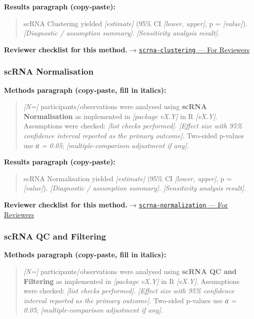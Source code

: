 \documentclass[
]{article}
\begin{document}
\textbf{Results paragraph (copy-paste):}

\begin{quote}
scRNA Clustering yielded \emph{{[}estimate{]}} (95\% CI \emph{{[}lower,
upper{]}}, p = \emph{{[}value{]}}). \emph{{[}Diagnostic / assumption
summary{]}}. \emph{{[}Sensitivity analysis result{]}}.
\end{quote}

\textbf{Reviewer checklist for this method.} →
\href{../chapters/12-bioinformatics/scrna-clustering.Rmd\#for-reviewers}{\texttt{scrna-clustering}
--- For Reviewers}

\subsubsection{scRNA Normalisation}\label{scrna-normalisation}

\textbf{Methods paragraph (copy-paste, fill in italics):}

\begin{quote}
\emph{{[}N={]}} participants/observations were analysed using
\textbf{scRNA Normalisation} as implemented in \emph{{[}package vX.Y{]}}
in R \emph{{[}vX.Y{]}}. Assumptions were checked: \emph{{[}list checks
performed{]}}. \emph{{[}Effect size with 95\% confidence interval
reported as the primary outcome{]}}. Two-sided p-values use \emph{α =
0.05}; \emph{{[}multiple-comparison adjustment if any{]}}.
\end{quote}

\textbf{Results paragraph (copy-paste):}

\begin{quote}
scRNA Normalisation yielded \emph{{[}estimate{]}} (95\% CI
\emph{{[}lower, upper{]}}, p = \emph{{[}value{]}}). \emph{{[}Diagnostic
/ assumption summary{]}}. \emph{{[}Sensitivity analysis result{]}}.
\end{quote}

\textbf{Reviewer checklist for this method.} →
\href{../chapters/12-bioinformatics/scrna-normalization.Rmd\#for-reviewers}{\texttt{scrna-normalization}
--- For Reviewers}

\subsubsection{scRNA QC and Filtering}\label{scrna-qc-and-filtering}

\textbf{Methods paragraph (copy-paste, fill in italics):}

\begin{quote}
\emph{{[}N={]}} participants/observations were analysed using
\textbf{scRNA QC and Filtering} as implemented in \emph{{[}package
vX.Y{]}} in R \emph{{[}vX.Y{]}}. Assumptions were checked: \emph{{[}list
checks performed{]}}. \emph{{[}Effect size with 95\% confidence interval
reported as the primary outcome{]}}. Two-sided p-values use \emph{α =
0.05}; \emph{{[}multiple-comparison adjustment if any{]}}.
\end{quote}
\end{document}
